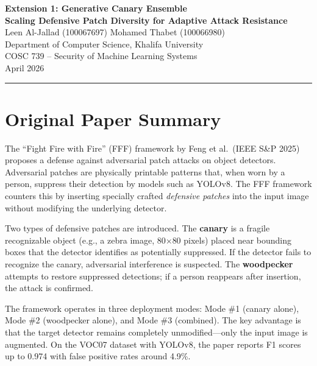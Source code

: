 \documentclass[11pt,a4paper]{article}
\begin{document}
\begin{center}
    {\LARGE\bfseries Extension 1: Generative Canary Ensemble\\[6pt]
    \large Scaling Defensive Patch Diversity for Adaptive Attack Resistance}\\[12pt]
    {\large Leen Al-Jallad (100067697) \quad Mohamed Thabet (100066980)}\\[4pt]
    {\normalsize Department of Computer Science, Khalifa University}\\
    {\normalsize COSC 739 -- Security of Machine Learning Systems}\\[6pt]
    {\normalsize April 2026}
\end{center}

\vspace{0.5cm}
\hrule
\vspace{0.5cm}

\section{Original Paper Summary}

The ``Fight Fire with Fire'' (FFF) framework by Feng et al.\ (IEEE S\&P 2025) proposes a defense against adversarial patch attacks on object detectors. Adversarial patches are physically printable patterns that, when worn by a person, suppress their detection by models such as YOLOv8. The FFF framework counters this by inserting specially crafted \textit{defensive patches} into the input image without modifying the underlying detector.

Two types of defensive patches are introduced. The \textbf{canary} is a fragile recognizable object (e.g., a zebra image, 80$\times$80 pixels) placed near bounding boxes that the detector identifies as potentially suppressed. If the detector fails to recognize the canary, adversarial interference is suspected. The \textbf{woodpecker} attempts to restore suppressed detections; if a person reappears after insertion, the attack is confirmed.

The framework operates in three deployment modes: Mode \#1 (canary alone), Mode \#2 (woodpecker alone), and Mode \#3 (combined). The key advantage is that the target detector remains completely unmodified---only the input image is augmented. On the VOC07 dataset with YOLOv8, the paper reports F1 scores up to 0.974 with false positive rates around 4.9\%.
\end{document}
